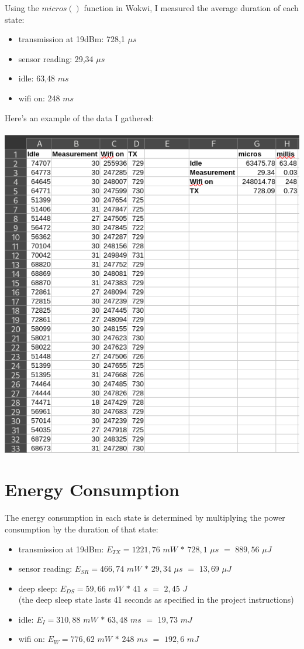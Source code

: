 \documentclass{Configuration_Files/PoliMi3i_thesis}
\begin{document}
Using the $micros()$ function in Wokwi, I measured the average duration of each state:
\begin{itemize}
    \item transmission at 19dBm: 728,1 $\mu s$
    \item sensor reading: 29,34 $\mu s$
    \item idle: 63,48 $ms$
    \item wifi on: 248 $ms$
\end{itemize}

Here's an example of the data I gathered: \\ \\
\includegraphics[width=\textwidth, height=0.71\textheight]{Images/state_duration.png}

\newpage
\section{Energy Consumption}
The energy consumption in each state is determined by multiplying the power consumption by the duration of that state:
\begin{itemize}
    \item transmission at 19dBm: $E_{TX} =1221,76$ $mW$ $*$ $728,1$ $\mu s$ $=$ $889,56$ $\mu J$
    \item sensor reading: $E_{SR} =466,74$ $mW$ $*$ $29,34$ $\mu s$ $=$ $13,69$ $\mu J$
    \item deep sleep: $E_{DS} =59,66$ $mW$ $*$ $41$ $s$ $=$ $2,45$ $J$ \\ (the deep sleep state lasts 41 seconds as specified in the project instructions)
    \item idle: $E_I =310,88$ $mW$ $*$ $63,48$ $ms$ $=$ $19,73$ $mJ$
    \item wifi on: $E_W =776,62$ $mW$ $*$ $248$ $ms$ $=$ $192,6$ $mJ$
\end{itemize}
\end{document}
